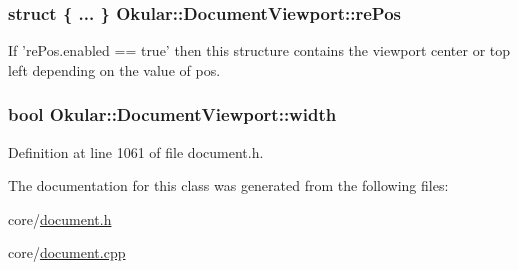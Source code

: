 \hypertarget{classOkular_1_1DocumentViewport_a054f24bcba44b795a3671ac53693ff45}{
\subsubsection[{re\+Pos}]{\setlength{\rightskip}{0pt plus 5cm}struct \{ ... \}   Okular\+::\+Document\+Viewport\+::re\+Pos}}\label{classOkular_1_1DocumentViewport_a054f24bcba44b795a3671ac53693ff45}
If 're\+Pos.\+enabled == true' then this structure contains the viewport center or top left depending on the value of pos. \hypertarget{classOkular_1_1DocumentViewport_a3cff94312e391a1b0b786a718ea72356}{
\subsubsection[{width}]{\setlength{\rightskip}{0pt plus 5cm}bool Okular\+::\+Document\+Viewport\+::width}}\label{classOkular_1_1DocumentViewport_a3cff94312e391a1b0b786a718ea72356}


Definition at line 1061 of file document.\+h.



The documentation for this class was generated from the following files\+:\begin{DoxyCompactItemize}
\item 
core/\hyperlink{core_2document_8h}{document.\+h}\item 
core/\hyperlink{core_2document_8cpp}{document.\+cpp}\end{DoxyCompactItemize}
